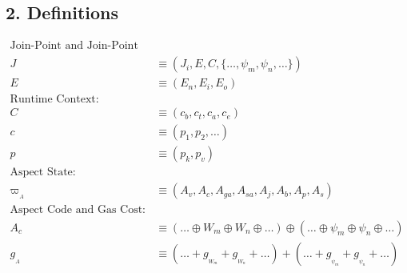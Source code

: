 \subsection*{2. Definitions}
\begin{align*}
\text{Join-Point and Join-Point Entry Point:} & \\
J & \equiv (J_i, E, C, \{ \ldots, \psi_m, \psi_n, \ldots \}) \\
E & \equiv (E_n, E_i, E_o) \\
\text{Runtime Context:} & \\
C & \equiv (c_b, c_t, c_a, c_e) \\
c & \equiv (p_1, p_2, \ldots) \\
p & \equiv (p_k, p_v) \\
\text{Aspect State:} & \\
\varpi_{_A} & \equiv (A_v, A_c, A_{ga}, A_{sa}, A_j, A_b, A_p, A_s) \\
\text{Aspect Code and Gas Cost:} & \\
A_c & \equiv (\ldots \oplus W_m \oplus W_n \oplus \ldots) \oplus (\ldots \oplus \psi_m \oplus \psi_n \oplus \ldots) \\
g_{_A} & \equiv (\ldots + g_{_{W_m}} + g_{_{W_n}} + \ldots) + (\ldots + g_{_{\psi_m}} + g_{_{\psi_n}} + \ldots) \\
\end{align*}

